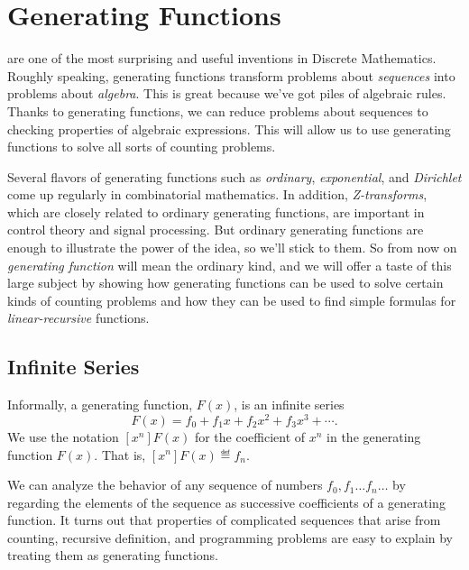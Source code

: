 \chapter{Generating Functions}\label{generating_function_chap}

 are one of the most surprising and useful
inventions in Discrete Mathematics.  Roughly speaking, generating
functions transform problems about \textit{sequences} into problems
about \textit{algebra}.  This is great because we've got piles of
algebraic rules.  Thanks to generating functions, we can reduce
problems about sequences to checking properties of algebraic
expressions.  This will allow us to use generating functions to
solve all sorts of counting problems.

Several flavors of generating functions such as \emph{ordinary},
\emph{exponential}, and \emph{Dirichlet} come up regularly in
combinatorial mathematics.  In addition, \emph{Z-transforms}, which
are closely related to ordinary generating functions, are important in
control theory and signal processing.  But ordinary generating
functions are enough to illustrate the power of the idea, so we'll
stick to them.  So from now on \emph{generating function} will mean
the ordinary kind, and we will offer a taste of this large subject by
showing how generating functions can be used to solve certain kinds of
counting problems and how they can be used to find simple formulas for
\emph{linear-recursive} functions.

\section{Infinite Series}
Informally, a generating function, $F(x)$, is an infinite series
\begin{equation}\label{def:Fxf_0}
F(x) = f_0 + f_1 x + f_2 x^2 + f_3 x^3 + \cdots.
\end{equation}
We use the notation $[x^n]F(x)$ for the coefficient of $x^n$ in the
generating function $F(x)$.  That is, $[x^n]F(x) \eqdef f_n$.

We can analyze the behavior of any sequence of numbers $f_0, f_1 \dots
f_n \dots$ by regarding the elements of the sequence as successive
coefficients of a generating function.  It turns out that properties
of complicated sequences that arise from counting, recursive
definition, and programming problems are easy to explain by treating
them as generating functions.

